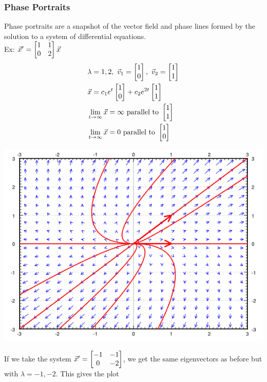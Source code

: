 \documentclass[11pt, fleqn]{article}
\begin{document}
\subsubsection{Phase Portraits}
Phase portraits are a snapshot of the vector field and phase lines formed by the solution to a system of differential equations.\\
Ex: $\vec{x}'=\matrixx{1&1\\0&2}\vec{x}$
\begin{align*}
    &\lambda=1,2,\ \vec{v}_1=\matrixx{1\\0},\ \vec{v}_2=\matrixx{1\\1}\\
    &\vec{x}=c_1e^{t}\matrixx{1\\0}+c_2e^{2t}\matrixx{1\\1}\\
    &\lim_{t\to\infty}\vec{x}=\infty\text{ parallel to }\matrixx{1\\1}\\
    &\lim_{t\to\infty}\vec{x}=0\text{ parallel to }\matrixx{1\\0}
\end{align*}
\centerline{\includegraphics[scale=0.8]{ODEPictures/phasePortrait1.png}}
If we take the system $\vec{x}'=\matrixx{-1&-1\\0&-2}$, we get the same eigenvectors as before but with $\lambda=-1,-2$. This gives the plot\\
\end{document}
